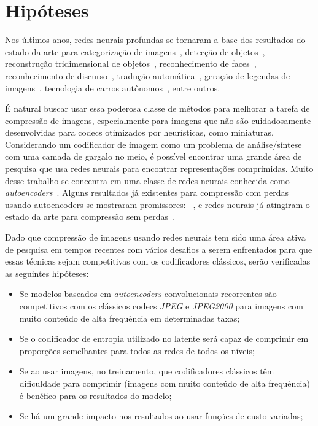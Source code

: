 \section{Hipóteses}
\label{sec:hipotese}
Nos últimos anos, redes neurais profundas se tornaram a base dos resultados do estado da arte para categorização de imagens~\cite{simonyan}, detecção de objetos~\cite{girshick2014rich}, reconstrução tridimensional de objetos~\cite{choy20163d}, reconhecimento de faces~\cite{deepface}, reconhecimento de discurso~\cite{graves}, tradução automática~\cite{sequence}, geração de legendas de imagens~\cite{vinyals2015show}, tecnologia de carros autônomos~\cite{huval2015empirical}, entre outros. 

É natural buscar usar essa poderosa classe de métodos para melhorar a tarefa de compressão de imagens, especialmente para imagens que não são cuidadosamente desenvolvidas para codecs otimizados por heurísticas, como miniaturas. Considerando um codificador de imagem como um problema de análise/síntese com uma camada de gargalo no meio, é possível encontrar uma grande área de pesquisa que usa redes neurais para encontrar representações comprimidas. Muito desse trabalho se concentra em uma classe de redes neurais conhecida como \emph{autoencoders}~\cite{autoencoder2011}. Alguns resultados já existentes para compressão com perdas usando autoencoders se mostraram promissores: ~\cite{gregor2016, toderici2017, toderici2016}, e redes neurais já atingiram o estado da arte para compressão sem perdas~\cite{mentzer2019, theis2015generative}. 

Dado que compressão de imagens usando redes neurais tem sido uma área ativa de pesquisa em tempos recentes com vários desafios a serem enfrentados para que essas técnicas sejam competitivas com os codificadores clássicos, serão verificadas as seguintes hipóteses:
\begin{itemize}
    \item Se modelos baseados em \textit{autoencoders} convolucionais recorrentes são competitivos com os clássicos codecs \textit{JPEG} e \textit{JPEG2000} para imagens com muito conteúdo de alta frequência em determinadas taxas;
    \item Se o codificador de entropia utilizado no latente será capaz de comprimir em proporções semelhantes para todos as redes de todos os níveis;
    \item Se ao usar imagens, no treinamento, que codificadores clássicos têm dificuldade para comprimir (imagens com muito conteúdo de alta frequência) é benéfico para os resultados do modelo;
    \item Se há um grande impacto nos resultados ao usar funções de custo variadas;
\end{itemize}

